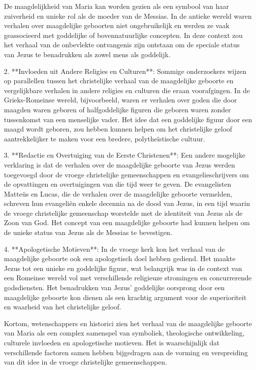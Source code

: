 De maagdelijkheid van Maria kan worden gezien als een symbool van haar zuiverheid en unieke rol als de moeder van de Messias. In de antieke wereld waren verhalen over maagdelijke geboorten niet ongebruikelijk en werden ze vaak geassocieerd met goddelijke of bovennatuurlijke concepten. In deze context zou het verhaal van de onbevlekte ontvangenis zijn ontstaan om de speciale status van Jezus te benadrukken als zowel mens als goddelijk.

2. **Invloeden uit Andere Religies en Culturen**: Sommige onderzoekers wijzen op parallellen tussen het christelijke verhaal van de maagdelijke geboorte en vergelijkbare verhalen in andere religies en culturen die eraan voorafgingen. In de Grieks-Romeinse wereld, bijvoorbeeld, waren er verhalen over goden die door maagden waren geboren of halfgoddelijke figuren die geboren waren zonder tussenkomst van een menselijke vader. Het idee dat een goddelijke figuur door een maagd wordt geboren, zou hebben kunnen helpen om het christelijke geloof aantrekkelijker te maken voor een bredere, polytheïstische cultuur.

3. **Redactie en Overtuiging van de Eerste Christenen**: Een andere mogelijke verklaring is dat de verhalen over de maagdelijke geboorte van Jezus werden toegevoegd door de vroege christelijke gemeenschappen en evangelieschrijvers om de opvattingen en overtuigingen van die tijd weer te geven. De evangelisten Matteüs en Lucas, die de verhalen over de maagdelijke geboorte vermelden, schreven hun evangeliën enkele decennia na de dood van Jezus, in een tijd waarin de vroege christelijke gemeenschap worstelde met de identiteit van Jezus als de Zoon van God. Het concept van een maagdelijke geboorte had kunnen helpen om de unieke status van Jezus als de Messias te bevestigen.

4. **Apologetische Motieven**: In de vroege kerk kon het verhaal van de maagdelijke geboorte ook een apologetisch doel hebben gediend. Het maakte Jezus tot een unieke en goddelijke figuur, wat belangrijk was in de context van een Romeinse wereld vol met verschillende religieuze stromingen en concurrerende godsdiensten. Het benadrukken van Jezus' goddelijke oorsprong door een maagdelijke geboorte kon dienen als een krachtig argument voor de superioriteit en waarheid van het christelijke geloof.

Kortom, wetenschappers en historici zien het verhaal van de maagdelijke geboorte van Maria als een complex samenspel van symboliek, theologische ontwikkeling, culturele invloeden en apologetische motieven. Het is waarschijnlijk dat verschillende factoren samen hebben bijgedragen aan de vorming en verspreiding van dit idee in de vroege christelijke gemeenschappen.

